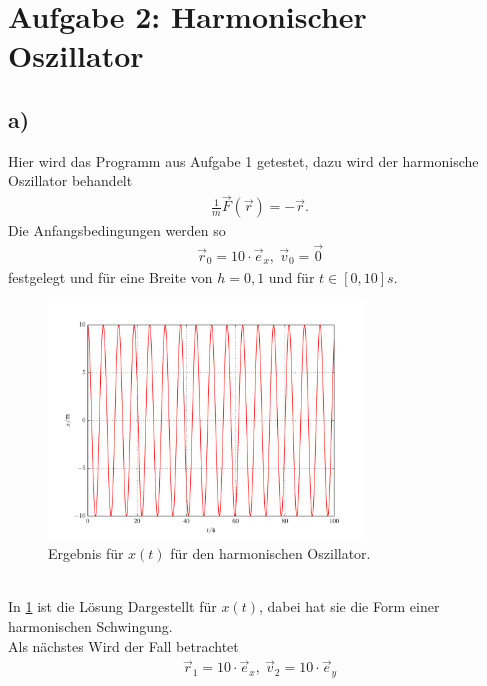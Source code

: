 
\section*{Aufgabe 2: Harmonischer Oszillator}
\subsection*{a)}
Hier wird das Programm aus Aufgabe 1 getestet, dazu wird der harmonische Oszillator behandelt
\begin{align}
	\frac{1}{m}\vec{F}(\vec{r})=-\vec{r}.
\end{align}
Die Anfangsbedingungen werden so 
\begin{align}
	\vec{r}_0=10\cdot\vec{e}_x,\ \vec{v}_0=\vec{0}
\end{align}
festgelegt und für eine Breite von $h=0,1$ und für $t\in[0,10]s$.\\
\begin{figure}[h!]
	\centering
	\includegraphics[width = 0.75\textwidth]{../Plots/Plot_2_A_1.pdf}
	\caption{Ergebnis für $x(t)$ für den harmonischen Oszillator.\label{fig:Zentral_X}}
\end{figure}\\
In \cref{fig:Zentral_X} ist die Lösung Dargestellt für $x(t)$, dabei hat sie die Form einer harmonischen Schwingung.\\
\newpage
Als nächstes Wird der Fall betrachtet 
\begin{align}
	\vec{r}_1=10\cdot\vec{e}_x,\ \vec{v}_2=10\cdot\vec{e}_y
\end{align}
